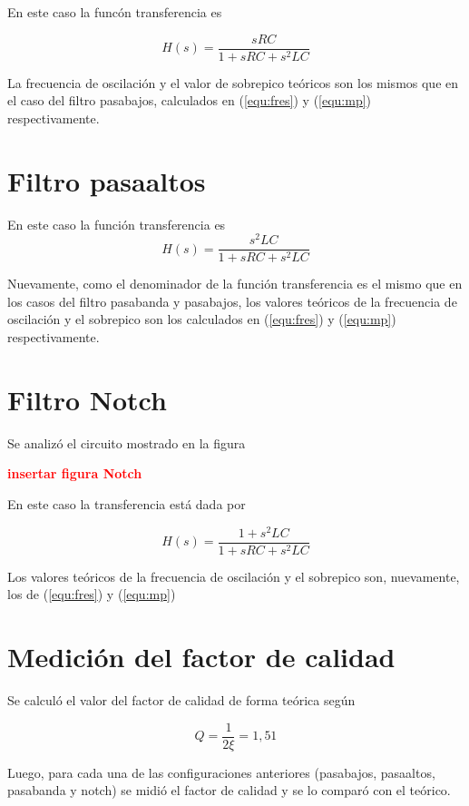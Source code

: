En este caso la funcón transferencia es 

\begin{equation}
    H(s)=\frac{sRC}{1+sRC+s^{2}LC}
\end{equation}

La frecuencia de oscilación y el valor de sobrepico teóricos son los mismos que en el caso del filtro pasabajos, calculados en (\ref{equ:fres}) y (\ref{equ:mp}) respectivamente.

\section{Filtro pasaaltos}

En este caso la función transferencia es
\begin{equation}
    H(s)=\frac{s^{2}LC}{1+sRC+s^{2}LC}
\end{equation}

Nuevamente, como el denominador de la función transferencia es el mismo que en los casos del filtro pasabanda y pasabajos, los valores teóricos de la frecuencia de oscilación y el sobrepico son los calculados en (\ref{equ:fres}) y (\ref{equ:mp}) respectivamente.

\section{Filtro Notch}

Se analizó el circuito mostrado en la figura
\begin{center}
	\textcolor{red}{\textbf{insertar figura Notch}}
\end{center}

En este caso la transferencia está dada por 

\begin{equation}
    H(s)=\frac{1+s^ {2}LC}{1+sRC+s^ {2}LC}
\end{equation}

Los valores teóricos de la frecuencia de oscilación y el sobrepico son, nuevamente, los de (\ref{equ:fres}) y (\ref{equ:mp})


\section{Medición del factor de calidad}

Se calculó el valor del factor de calidad de forma teórica según 

\begin{equation}
    Q=\frac{1}{2\xi}=1,51
\end{equation}

Luego, para cada una de las configuraciones anteriores (pasabajos, pasaaltos, pasabanda y notch) se midió el factor de calidad y se lo comparó con el teórico.



